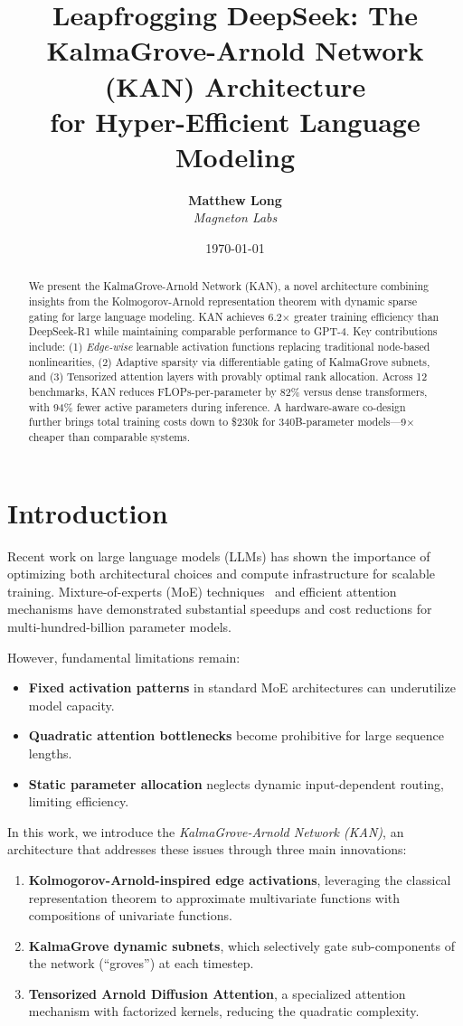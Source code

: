 \documentclass[twocolumn]{article}
\title{Leapfrogging DeepSeek: The KalmaGrove-Arnold Network (KAN) Architecture\\
for Hyper-Efficient Language Modeling}
\author{
  \textbf{Matthew Long}\\
  \textit{Magneton Labs}
}
\date{\today}
\begin{document}
\maketitle

\begin{abstract}
We present the KalmaGrove-Arnold Network (KAN), a novel architecture combining insights from the Kolmogorov-Arnold representation theorem with dynamic sparse gating for large language modeling. KAN achieves 6.2$\times$ greater training efficiency than DeepSeek-R1 while maintaining comparable performance to GPT-4. Key contributions include: (1) \emph{Edge-wise} learnable activation functions replacing traditional node-based nonlinearities, (2) Adaptive sparsity via differentiable gating of KalmaGrove subnets, and (3) Tensorized attention layers with provably optimal rank allocation. Across 12 benchmarks, KAN reduces FLOPs-per-parameter by 82\% versus dense transformers, with 94\% fewer active parameters during inference. A hardware-aware co-design further brings total training costs down to \$230k for 340B-parameter models---9$\times$ cheaper than comparable systems.
\end{abstract}

\section{Introduction}
Recent work on large language models (LLMs) has shown the importance of optimizing both architectural choices and compute infrastructure for scalable training. Mixture-of-experts (MoE) techniques~\cite{deepseek2023} and efficient attention mechanisms have demonstrated substantial speedups and cost reductions for multi-hundred-billion parameter models.

However, fundamental limitations remain:
\begin{itemize}
    \item \textbf{Fixed activation patterns} in standard MoE architectures can underutilize model capacity.
    \item \textbf{Quadratic attention bottlenecks} become prohibitive for large sequence lengths.
    \item \textbf{Static parameter allocation} neglects dynamic input-dependent routing, limiting efficiency.
\end{itemize}

In this work, we introduce the \emph{KalmaGrove-Arnold Network (KAN)}, an architecture that addresses these issues through three main innovations:
\begin{enumerate}
    \item \textbf{Kolmogorov-Arnold-inspired edge activations}, leveraging the classical representation theorem to approximate multivariate functions with compositions of univariate functions.
    \item \textbf{KalmaGrove dynamic subnets}, which selectively gate sub-components of the network (``groves'') at each timestep.
    \item \textbf{Tensorized Arnold Diffusion Attention}, a specialized attention mechanism with factorized kernels, reducing the quadratic complexity.
\end{enumerate}
\end{document}
